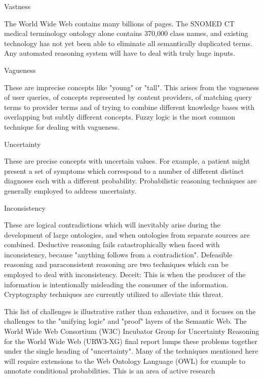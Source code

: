 \begin{compactitem}
\item Vastness

The World Wide Web contains many billions of pages. The SNOMED CT medical terminology ontology alone contains 370,000 class names, and existing technology has not yet been able to eliminate all semantically duplicated terms. Any automated reasoning system will have to deal with truly huge inputs.

\item Vagueness

These are imprecise concepts like "young" or "tall". This arises from the vagueness of user queries, of concepts represented by content providers, of matching query terms to provider terms and of trying to combine different knowledge bases with overlapping but subtly different concepts. Fuzzy logic is the most common technique for dealing with vagueness.

\item Uncertainty

These are precise concepts with uncertain values. For example, a patient might present a set of symptoms which correspond to a number of different distinct diagnoses each with a different probability. Probabilistic reasoning techniques are generally employed to address uncertainty.

\item Inconsistency

These are logical contradictions which will inevitably arise during the development of large ontologies, and when ontologies from separate sources are combined. Deductive reasoning fails catastrophically when faced with inconsistency, because "anything follows from a contradiction". Defeasible reasoning and paraconsistent reasoning are two techniques which can be employed to deal with inconsistency.
Deceit: This is when the producer of the information is intentionally misleading the consumer of the information. Cryptography techniques are currently utilized to alleviate this threat.
\end{compactitem}


This list of challenges is illustrative rather than exhaustive, and it focuses on the challenges to the "unifying logic" and "proof" layers of the Semantic Web. The World Wide Web Consortium (W3C) Incubator Group for Uncertainty Reasoning for the World Wide Web (URW3-XG) final report lumps these problems together under the single heading of "uncertainty". Many of the techniques mentioned here will require extensions to the Web Ontology Language (OWL) for example to annotate conditional probabilities. This is an area of active research



